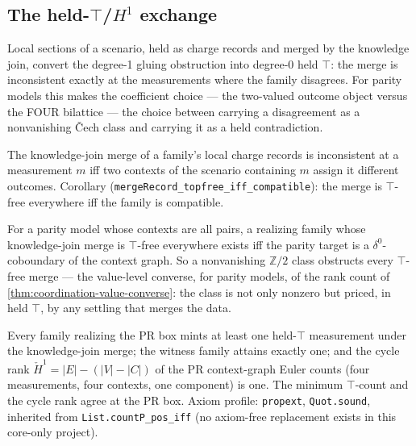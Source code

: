 \subsection{The held-\(\top\)/\(H^1\) exchange}

Local sections of a scenario, held as charge records and merged by the
knowledge join, convert the degree-1 gluing obstruction into degree-0 held
\(\top\): the merge is inconsistent exactly at the measurements where the
family disagrees. For parity models this makes the coefficient choice --- the
two-valued outcome object versus the FOUR bilattice --- the choice between
carrying a disagreement as a nonvanishing \v{C}ech class and carrying it as a
held contradiction.

\begin{theorem}\label{thm:merge-inconsistency-disagreement}\leanok{}
The knowledge-join merge of a family's local charge records is inconsistent
at a measurement \(m\) iff two contexts of the scenario containing \(m\)
assign it different outcomes. Corollary
(\texttt{mergeRecord\_topfree\_iff\_compatible}): the merge is \(\top\)-free
everywhere iff the family is compatible.
\end{theorem}

\begin{theorem}\label{thm:top-h1-exchange}\leanok{}
For a parity model whose contexts are all pairs, a realizing family whose
knowledge-join merge is \(\top\)-free everywhere exists iff the parity target
is a \(\delta^0\)-coboundary of the context graph. So a nonvanishing
\(\mathbb{Z}/2\) class obstructs every \(\top\)-free merge --- the value-level
converse, for parity models, of the rank count of
\ref{thm:coordination-value-converse}: the class is not only nonzero but
priced, in held \(\top\), by any settling that merges the data.
\end{theorem}

\begin{theorem}\label{thm:pr-top-h1-exchange}\leanok{}
Every family realizing the PR box mints at least one held-\(\top\)
measurement under the knowledge-join merge; the witness family attains
exactly one; and the cycle rank \(\check H^1 = |E| - (|V| - |C|)\) of the PR
context-graph Euler counts (four measurements, four contexts, one component)
is one. The minimum \(\top\)-count and the cycle rank agree at the PR box.
Axiom profile: \texttt{propext}, \texttt{Quot.sound}, inherited from
\texttt{List.countP\_pos\_iff} (no axiom-free replacement exists in this
core-only project).
\end{theorem}

